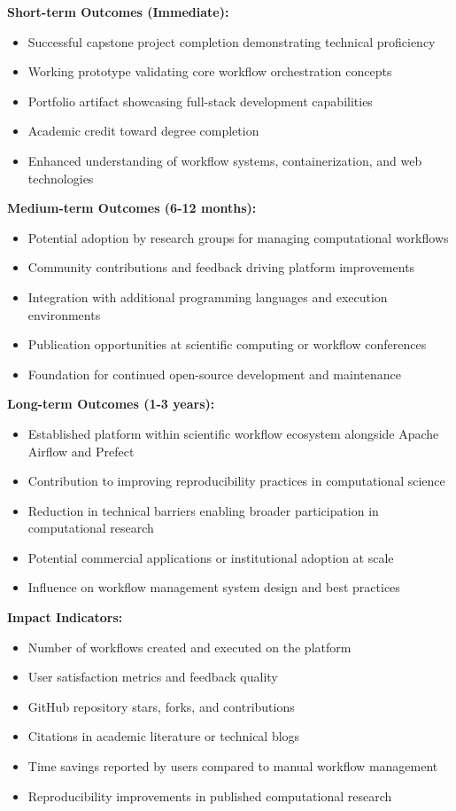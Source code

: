 \documentclass[12pt]{article}
\begin{document}
\textbf{Short-term Outcomes (Immediate):}
\begin{itemize}
    \item Successful capstone project completion demonstrating technical proficiency
    \item Working prototype validating core workflow orchestration concepts
    \item Portfolio artifact showcasing full-stack development capabilities
    \item Academic credit toward degree completion
    \item Enhanced understanding of workflow systems, containerization, and web technologies
\end{itemize}

\textbf{Medium-term Outcomes (6-12 months):}
\begin{itemize}
    \item Potential adoption by research groups for managing computational workflows
    \item Community contributions and feedback driving platform improvements
    \item Integration with additional programming languages and execution environments
    \item Publication opportunities at scientific computing or workflow conferences
    \item Foundation for continued open-source development and maintenance
\end{itemize}

\textbf{Long-term Outcomes (1-3 years):}
\begin{itemize}
    \item Established platform within scientific workflow ecosystem alongside Apache Airflow and Prefect
    \item Contribution to improving reproducibility practices in computational science
    \item Reduction in technical barriers enabling broader participation in computational research
    \item Potential commercial applications or institutional adoption at scale
    \item Influence on workflow management system design and best practices
\end{itemize}

\textbf{Impact Indicators:}
\begin{itemize}
    \item Number of workflows created and executed on the platform
    \item User satisfaction metrics and feedback quality
    \item GitHub repository stars, forks, and contributions
    \item Citations in academic literature or technical blogs
    \item Time savings reported by users compared to manual workflow management
    \item Reproducibility improvements in published computational research
\end{itemize}
\end{document}
